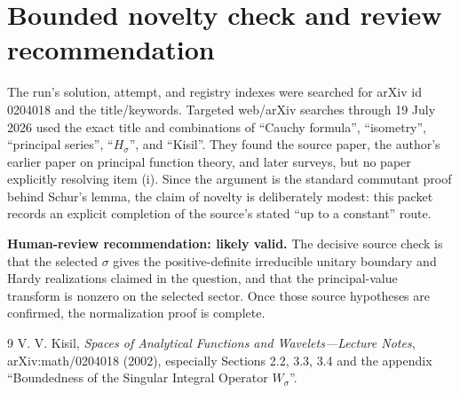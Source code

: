 \documentclass[11pt]{article}
\begin{document}
\section{Bounded novelty check and review recommendation}

The run's solution, attempt, and registry indexes were searched for arXiv id
0204018 and the title/keywords.  Targeted web/arXiv searches through
19 July 2026 used the exact title and combinations of ``Cauchy formula'',
``isometry'', ``principal series'', ``$H_\sigma$'', and ``Kisil''.  They found
the source paper, the author's earlier paper on principal function theory,
and later surveys, but no paper explicitly resolving item (i).  Since the
argument is the standard commutant proof behind Schur's lemma, the claim of
novelty is deliberately modest: this packet records an explicit completion
of the source's stated ``up to a constant'' route.

\textbf{Human-review recommendation: likely valid.}  The decisive source
check is that the selected $\sigma$ gives the positive-definite irreducible
unitary boundary and Hardy realizations claimed in the question, and that the
principal-value transform is nonzero on the selected sector.  Once those
source hypotheses are confirmed, the normalization proof is complete.

\begin{thebibliography}{9}
V. V. Kisil,
\emph{Spaces of Analytical Functions and Wavelets---Lecture Notes},
arXiv:math/0204018 (2002), especially Sections 2.2, 3.3, 3.4 and the appendix
``Boundedness of the Singular Integral Operator $W_\sigma$''.
\end{thebibliography}
\end{document}
